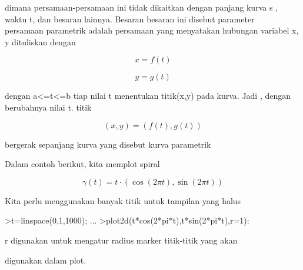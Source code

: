 \documentclass[a4paper,10pt]{article}
\begin{document}
\begin{eulernotebook}
\begin{eulercomment}
\begin{eulercomment}
\begin{eulercomment}
\begin{eulercomment}
\begin{eulercomment}
\begin{eulercomment}
\begin{eulercomment}
dimana persamaan-persamaan ini tidak dikaitkan dengan panjang kurva s
, waktu t, dan besaran lainnya. Besaran besaran ini disebut parameter\\
persamaan parametrik adalah persamaan yang menyatakan hubungan
variabel x, y dituliskan dengan\\
\end{eulercomment}
\begin{eulerformula}
\[
x=f(t)
\]
\end{eulerformula}
\begin{eulerformula}
\[
y=g(t)
\]
\end{eulerformula}
\begin{eulercomment}
dengan a\textless{}=t\textless{}=b tiap nilai t menentukan titik(x,y) pada kurva. Jadi ,
dengan berubahnya nilai t. titik\\
\end{eulercomment}
\begin{eulerformula}
\[
(x,y) = (f(t),g(t))
\]
\end{eulerformula}
\begin{eulercomment}
bergerak sepanjang kurva yang disebut kurva parametrik


Dalam contoh berikut, kita memplot spiral

\end{eulercomment}
\begin{eulerformula}
\[
\gamma(t) = t \cdot (\cos(2\pi t),\sin(2\pi t))
\]
\end{eulerformula}
\begin{eulercomment}
Kita perlu menggunakan banyak titik untuk tampilan yang halus
\end{eulercomment}
\begin{eulerprompt}
>t=linspace(0,1,1000); ...
>plot2d(t*cos(2*pi*t),t*sin(2*pi*t),r=1):
\end{eulerprompt}
\begin{eulerttcomment}
 r digunakan untuk mengatur radius marker titik-titik yang akan
\end{eulerttcomment}
\begin{eulercomment}
digunakan dalam plot.




\end{eulercomment}
\end{eulercomment}
\end{eulercomment}
\end{eulercomment}
\end{eulercomment}
\end{eulercomment}
\end{eulercomment}
\end{eulernotebook}
\end{document}
